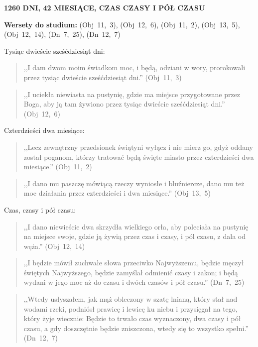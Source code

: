 \documentclass[10pt,a4paper,oneside]{article}
\begin{document}
\centerline{\textbf{\MakeUppercase{1260 dni, 42 miesiące, czas czasy i pół czasu}}}
\begin{center}
\textbf{Wersety do studium:} \mbox{(Obj 11, 3)}, \mbox{(Obj 12, 6)}, \mbox{(Obj 11, 2)}, \mbox{(Obj 13, 5)}, \mbox{(Obj 12, 14)}, \mbox{(Dn 7, 25)}, \mbox{(Dn 12, 7)}
\end{center}
Tysiąc dwieście sześćdziesiąt dni:
\begin{quote}
,,I dam dwom moim świadkom moc, i będą, odziani w wory, prorokowali przez tysiąc dwieście sześćdziesiąt dni.'' \mbox{(Obj 11, 3)}
\end{quote}
\begin{quote}
,,I uciekła niewiasta na pustynię, gdzie ma miejsce przygotowane przez Boga, aby ją tam żywiono przez tysiąc dwieście sześćdziesiąt dni.'' \mbox{(Obj 12, 6)}
\end{quote}
Czterdzieści dwa miesiące:
\begin{quote}
,,Lecz zewnętrzny przedsionek świątyni wyłącz i nie mierz go, gdyż oddany został poganom, którzy tratować będą święte miasto przez czterdzieści dwa miesiące.'' \mbox{(Obj 11, 2)}
\end{quote}
\begin{quote}
,,I dano mu paszczę mówiącą rzeczy wyniosłe i bluźniercze, dano mu też moc działania przez czterdzieści i dwa miesiące.'' \mbox{(Obj 13, 5)}
\end{quote}
Czas, czasy i pół czasu:
\begin{quote}
,,I dano niewieście dwa skrzydła wielkiego orła, aby poleciała na pustynię na miejsce swoje, gdzie ją żywią przez czas i czasy, i pól czasu, z dala od węża.'' \mbox{(Obj 12, 14)}
\end{quote}
\begin{quote}
,,I będzie mówił zuchwałe słowa przeciwko Najwyższemu, będzie męczył świętych Najwyższego, będzie zamyślał odmienić czasy i zakon; i będą wydani w jego moc aż do czasu i dwóch czasów i pół czasu.'' \mbox{(Dn 7, 25)}
\end{quote}
\begin{quote}
,,Wtedy usłyszałem, jak mąż obleczony w szatę lnianą, który stał nad wodami rzeki, podniósł prawicę i lewicę ku niebu i przysięgał na tego, który żyje wiecznie: Będzie to trwało czas wyznaczony, dwa czasy i pół czasu, a gdy doszczętnie będzie zniszczona, wtedy się to wszystko spełni.'' \mbox{(Dn 12, 7)}
\end{quote}
\end{document}
